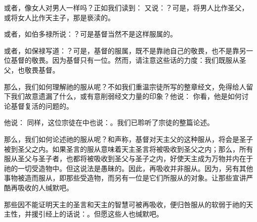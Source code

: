 或者，像女人对男人一样吗？正如我们读到： 又说：？可是，将男人比作圣父，或将女人比作天主子，那是亵渎的。\par

或者，如伯多禄所说：？可是基督当然不是这样服属的。\par

或者，如保禄写道：？可是，基督的服属，既不是靠祂自己的敬畏，也不是靠另一位基督的敬畏。因为基督只有一位。然而，请注意这些话的力度：我们既服从圣父，也敬畏基督。\par

那么，我们如何理解祂的服从呢？不如我们重温宗徒所写的整章经文，免得给人留下我们故意遗漏了什么，或有意削弱经文力量的印象？他说： 你看，他是如何讨论基督复活的问题的。\par

他说： 同样，这位宗徒在中也说：。我们已聆听了宗徒的整篇论述。\par

那么，我们如何论述祂的服从呢？和声称，基督对天主父的这种服从，将会是圣子被到圣父之内。如果圣言的服从意味着天主圣言将被吸收到圣父之内；那么，所有服从圣父与圣子者，也都将被吸收到圣父与圣子之内，好使天主成为万物并内在于祂的一切受造物中。但这说法是愚昧的。因此，再吸收并非服从。因为，另有其他事物被造而服从，即那些受造物，而另有一位是它们所服从的对象。让那些宣讲严酷再吸收的人缄默吧。\par

那些因不能证明天主的圣言和天主的智慧可被再吸收，便归咎服从的软弱于祂的天主性，并援引经上的话说：。但愿这些人也缄默吧。\par

